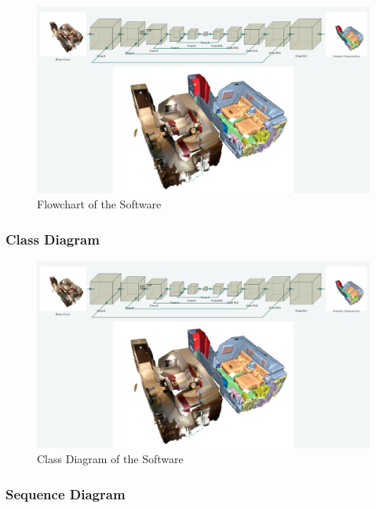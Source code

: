 \documentclass[11pt, a4paper,oneside,chapterprefix=false]{scrbook}
\begin{document}
\begin{minipage}{\textwidth}
	\begin{figure}[H]
		\centering
		\includegraphics*[width=1.0\textwidth]{figures/Minkowski Engine.png}
		\caption{Flowchart of the Software}
		\label{fig:flowchart}
	\end{figure}
\end{minipage}

\subsubsection{Class Diagram}

\begin{minipage}{\textwidth}
	\begin{figure}[H]
		\centering
		\includegraphics*[width=1.0\textwidth]{figures/Minkowski Engine.png}
		\caption{Class Diagram of the Software}
		\label{fig:class diagram}
	\end{figure}
\end{minipage}

\subsubsection{Sequence Diagram}
\end{document}
